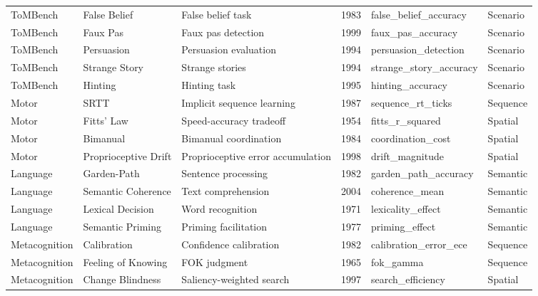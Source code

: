 \documentclass[10pt,landscape]{article}
\begin{document}
\begin{longtable}{@{}p{2.3cm}p{3.0cm}p{4.5cm}p{0.6cm}p{3.8cm}p{1.8cm}@{}}
\midrule
ToMBench & False Belief & False belief task \citep{baroncohen1985mindblindness} & 1983 & false\_belief\_accuracy & Scenario \\
ToMBench & Faux Pas & Faux pas detection \citep{stone1998faux} & 1999 & faux\_pas\_accuracy & Scenario \\
ToMBench & Persuasion & Persuasion evaluation & 1994 & persuasion\_detection & Scenario \\
ToMBench & Strange Story & Strange stories \citep{happe1994advanced} & 1994 & strange\_story\_accuracy & Scenario \\
ToMBench & Hinting & Hinting task \citep{corcoran1995schizophrenia} & 1995 & hinting\_accuracy & Scenario \\

\midrule
Motor & SRTT & Implicit sequence learning \citep{nissen1987attentional} & 1987 & sequence\_rt\_ticks & Sequence \\
Motor & Fitts' Law & Speed-accuracy tradeoff \citep{fitts1954information} & 1954 & fitts\_r\_squared & Spatial \\
Motor & Bimanual & Bimanual coordination & 1984 & coordination\_cost & Spatial \\
Motor & Proprioceptive Drift & Proprioceptive error accumulation & 1998 & drift\_magnitude & Spatial \\

\midrule
Language & Garden-Path & Sentence processing \citep{ferreira2002good} & 1982 & garden\_path\_accuracy & Semantic \\
Language & Semantic Coherence & Text comprehension & 2004 & coherence\_mean & Semantic \\
Language & Lexical Decision & Word recognition & 1971 & lexicality\_effect & Semantic \\
Language & Semantic Priming & Priming facilitation & 1977 & priming\_effect & Semantic \\

\midrule
Metacognition & Calibration & Confidence calibration & 1982 & calibration\_error\_ece & Sequence \\
Metacognition & Feeling of Knowing & FOK judgment & 1965 & fok\_gamma & Sequence \\
Metacognition & Change Blindness & Saliency-weighted search \citep{rensink1997see} & 1997 & search\_efficiency & Spatial \\


\end{longtable}
\end{document}

